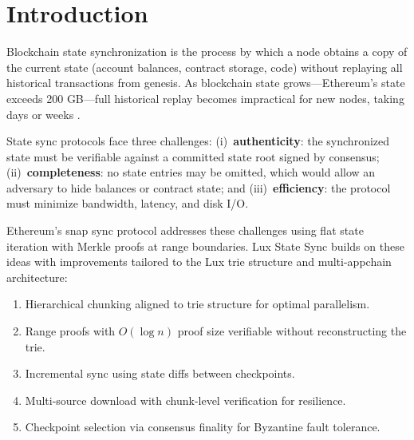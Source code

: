 \section{Introduction}


Blockchain state synchronization is the process by which a node obtains a copy of the current state (account balances, contract storage, code) without replaying all historical transactions from genesis. As blockchain state grows---Ethereum's state exceeds 200 GB---full historical replay becomes impractical for new nodes, taking days or weeks \cite{wood2014ethereum}.

State sync protocols face three challenges: (i)~\textbf{authenticity}: the synchronized state must be verifiable against a committed state root signed by consensus; (ii)~\textbf{completeness}: no state entries may be omitted, which would allow an adversary to hide balances or contract state; and (iii)~\textbf{efficiency}: the protocol must minimize bandwidth, latency, and disk I/O.

Ethereum's snap sync protocol \cite{ethsnapSync} addresses these challenges using flat state iteration with Merkle proofs at range boundaries. Lux State Sync builds on these ideas with improvements tailored to the Lux trie structure and multi-appchain architecture:

\begin{enumerate}[label=(\roman*)]
    \item Hierarchical chunking aligned to trie structure for optimal parallelism.
    \item Range proofs with $O(\log n)$ proof size verifiable without reconstructing the trie.
    \item Incremental sync using state diffs between checkpoints.
    \item Multi-source download with chunk-level verification for resilience.
    \item Checkpoint selection via consensus finality for Byzantine fault tolerance.
\end{enumerate}

